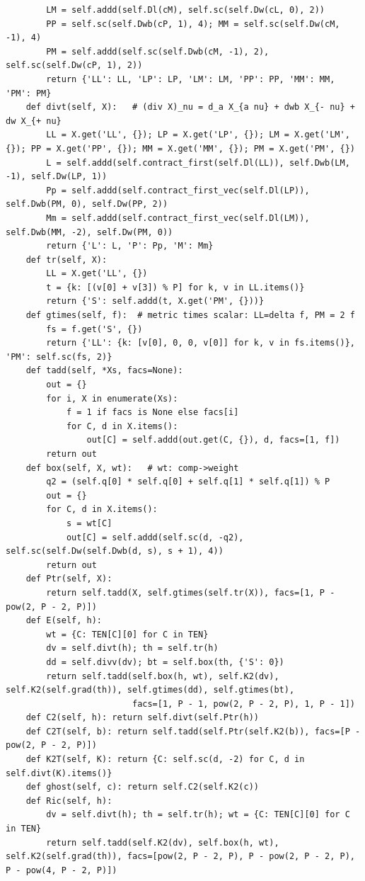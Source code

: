 \documentclass[10pt]{article}
\begin{document}
\begin{lstlisting}
        LM = self.addd(self.Dl(cM), self.sc(self.Dw(cL, 0), 2))
        PP = self.sc(self.Dwb(cP, 1), 4); MM = self.sc(self.Dw(cM, -1), 4)
        PM = self.addd(self.sc(self.Dwb(cM, -1), 2), self.sc(self.Dw(cP, 1), 2))
        return {'LL': LL, 'LP': LP, 'LM': LM, 'PP': PP, 'MM': MM, 'PM': PM}
    def divt(self, X):   # (div X)_nu = d_a X_{a nu} + dwb X_{- nu} + dw X_{+ nu}
        LL = X.get('LL', {}); LP = X.get('LP', {}); LM = X.get('LM', {}); PP = X.get('PP', {}); MM = X.get('MM', {}); PM = X.get('PM', {})
        L = self.addd(self.contract_first(self.Dl(LL)), self.Dwb(LM, -1), self.Dw(LP, 1))
        Pp = self.addd(self.contract_first_vec(self.Dl(LP)), self.Dwb(PM, 0), self.Dw(PP, 2))
        Mm = self.addd(self.contract_first_vec(self.Dl(LM)), self.Dwb(MM, -2), self.Dw(PM, 0))
        return {'L': L, 'P': Pp, 'M': Mm}
    def tr(self, X):
        LL = X.get('LL', {})
        t = {k: [(v[0] + v[3]) % P] for k, v in LL.items()}
        return {'S': self.addd(t, X.get('PM', {}))}
    def gtimes(self, f):  # metric times scalar: LL=delta f, PM = 2 f
        fs = f.get('S', {})
        return {'LL': {k: [v[0], 0, 0, v[0]] for k, v in fs.items()}, 'PM': self.sc(fs, 2)}
    def tadd(self, *Xs, facs=None):
        out = {}
        for i, X in enumerate(Xs):
            f = 1 if facs is None else facs[i]
            for C, d in X.items():
                out[C] = self.addd(out.get(C, {}), d, facs=[1, f])
        return out
    def box(self, X, wt):   # wt: comp->weight
        q2 = (self.q[0] * self.q[0] + self.q[1] * self.q[1]) % P
        out = {}
        for C, d in X.items():
            s = wt[C]
            out[C] = self.addd(self.sc(d, -q2), self.sc(self.Dw(self.Dwb(d, s), s + 1), 4))
        return out
    def Ptr(self, X):
        return self.tadd(X, self.gtimes(self.tr(X)), facs=[1, P - pow(2, P - 2, P)])
    def E(self, h):
        wt = {C: TEN[C][0] for C in TEN}
        dv = self.divt(h); th = self.tr(h)
        dd = self.divv(dv); bt = self.box(th, {'S': 0})
        return self.tadd(self.box(h, wt), self.K2(dv), self.K2(self.grad(th)), self.gtimes(dd), self.gtimes(bt),
                         facs=[1, P - 1, pow(2, P - 2, P), 1, P - 1])
    def C2(self, h): return self.divt(self.Ptr(h))
    def C2T(self, b): return self.tadd(self.Ptr(self.K2(b)), facs=[P - pow(2, P - 2, P)])
    def K2T(self, K): return {C: self.sc(d, -2) for C, d in self.divt(K).items()}
    def ghost(self, c): return self.C2(self.K2(c))
    def Ric(self, h):
        dv = self.divt(h); th = self.tr(h); wt = {C: TEN[C][0] for C in TEN}
        return self.tadd(self.K2(dv), self.box(h, wt), self.K2(self.grad(th)), facs=[pow(2, P - 2, P), P - pow(2, P - 2, P), P - pow(4, P - 2, P)])


\end{lstlisting}
\end{document}
